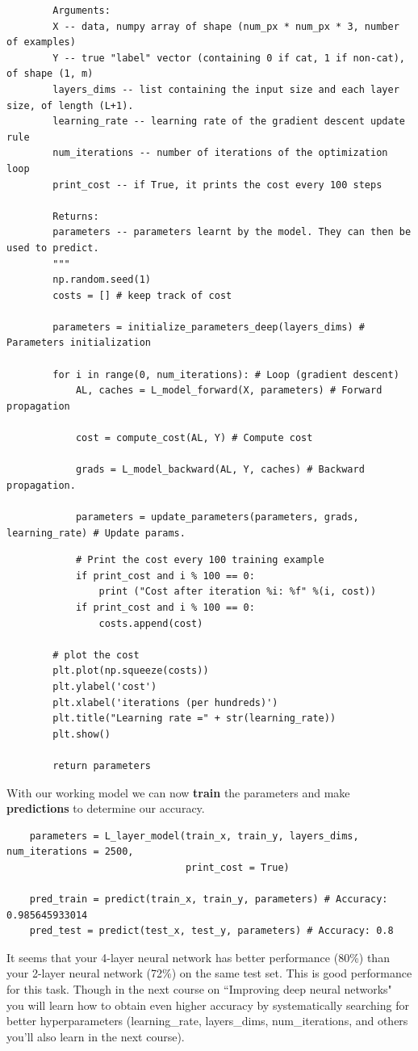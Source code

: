 \documentclass[11pt, a4paper]{article}
\begin{document}
\begin{spacing}{1.1}
\begin{lstlisting}
		Arguments:
		X -- data, numpy array of shape (num_px * num_px * 3, number of examples)
		Y -- true "label" vector (containing 0 if cat, 1 if non-cat), of shape (1, m)
		layers_dims -- list containing the input size and each layer size, of length (L+1).
		learning_rate -- learning rate of the gradient descent update rule
		num_iterations -- number of iterations of the optimization loop
		print_cost -- if True, it prints the cost every 100 steps
		
		Returns:
		parameters -- parameters learnt by the model. They can then be used to predict.
		"""
		np.random.seed(1)
		costs = [] # keep track of cost
		
		parameters = initialize_parameters_deep(layers_dims) # Parameters initialization
		
		for i in range(0, num_iterations): # Loop (gradient descent)
			AL, caches = L_model_forward(X, parameters) # Forward propagation

			cost = compute_cost(AL, Y) # Compute cost
			
			grads = L_model_backward(AL, Y, caches) # Backward propagation.
			
			parameters = update_parameters(parameters, grads, learning_rate) # Update params.\end{lstlisting} \newpage
			
	\begin{lstlisting}			
			# Print the cost every 100 training example
			if print_cost and i % 100 == 0:
				print ("Cost after iteration %i: %f" %(i, cost))
			if print_cost and i % 100 == 0:
				costs.append(cost)
		
		# plot the cost
		plt.plot(np.squeeze(costs))
		plt.ylabel('cost')
		plt.xlabel('iterations (per hundreds)')
		plt.title("Learning rate =" + str(learning_rate))
		plt.show()
		
		return parameters \end{lstlisting} \vspace*{1mm}
	With our working model we can now \textbf{train} the parameters and make \textbf{predictions} to determine our accuracy.
	\begin{lstlisting}
	parameters = L_layer_model(train_x, train_y, layers_dims, num_iterations = 2500, 
	                           print_cost = True)
				
	pred_train = predict(train_x, train_y, parameters) # Accuracy: 0.985645933014
	pred_test = predict(test_x, test_y, parameters) # Accuracy: 0.8	\end{lstlisting} \vspace*{1mm}
	It seems that your 4-layer neural network has better performance (80\%) than your 2-layer neural network (72\%) on the same test set. This is good performance for this task. Though in the next course on ``Improving deep neural networks" you will learn how to obtain even higher accuracy by systematically searching for better hyperparameters (learning\_rate, layers\_dims, num\_iterations, and others you'll also learn in the next course). \newpage


\end{spacing}
\end{document}
